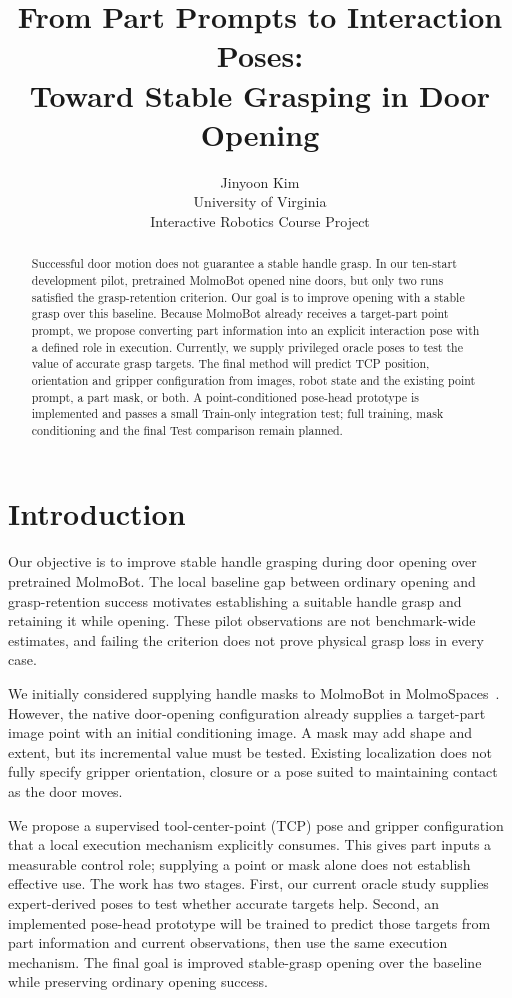 \documentclass{article}
\title{From Part Prompts to Interaction Poses:\\Toward Stable Grasping in Door Opening}
\author{Jinyoon Kim\\University of Virginia\\Interactive Robotics Course Project}
\begin{document}
\maketitle

\begin{abstract}
Successful door motion does not guarantee a stable handle grasp. In our
ten-start development pilot, pretrained MolmoBot opened nine doors, but only
two runs satisfied the grasp-retention criterion. Our goal is to improve
opening with a stable grasp over this baseline. Because MolmoBot already
receives a target-part point prompt, we propose converting part information
into an explicit interaction pose with a defined role in execution. Currently,
we supply privileged oracle poses to test the value of accurate grasp targets.
The final method will predict TCP position, orientation and gripper
configuration from images, robot state and the existing point prompt, a part
mask, or both. A point-conditioned pose-head prototype is implemented and passes
a small Train-only integration test; full training, mask conditioning and the
final Test comparison remain planned.
\end{abstract}

\section{Introduction}
\label{sec:intro}
Our objective is to improve stable handle grasping during door opening over
pretrained MolmoBot. The local baseline gap between ordinary opening and
grasp-retention success motivates establishing a suitable handle grasp and
retaining it while opening. These pilot observations are not benchmark-wide
estimates, and failing the criterion does not prove physical grasp loss in
every case.

We initially considered supplying handle masks to MolmoBot in
MolmoSpaces~\citep{kim2026molmospaces,deshpande2026molmobot}. However, the native
door-opening configuration already supplies a target-part image point with an
initial conditioning image. A mask may add shape and extent, but its incremental
value must be tested. Existing localization does not fully specify gripper
orientation, closure or a pose suited to maintaining contact as the door moves.

We propose a supervised tool-center-point (TCP) pose and gripper configuration
that a local execution mechanism explicitly consumes. This gives part inputs
a measurable control role; supplying a point or mask alone does not establish
effective use. The work has two stages. First, our current oracle study supplies
expert-derived poses to test whether accurate targets help. Second, an implemented
pose-head prototype will be trained to predict those targets from part information
and current observations, then use the same execution mechanism. The final goal is improved stable-grasp
opening over the baseline while preserving ordinary opening success.
\end{document}
